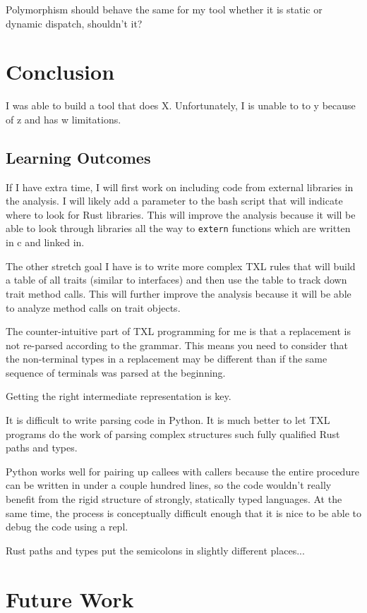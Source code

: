 \documentclass[11pt]{article}
\begin{document}
Polymorphism should behave the same for my tool whether it is static or dynamic dispatch, shouldn't it?

\section{Conclusion}
I was able to build a tool that does X.
Unfortunately, I is unable to to y because of z and has w limitations.

\subsection{Learning Outcomes}
If I have extra time, I will first work on including code from external libraries in the analysis.
I will likely add a parameter to the bash script that will indicate where to look for Rust libraries.
This will improve the analysis because it will be able to look through libraries all the way to \lstinline{extern} functions which are written in c and linked in.

The other stretch goal I have is to write more complex TXL rules that will build a table of all traits (similar to interfaces) and then use the table to track down trait method calls.
This will further improve the analysis because it will be able to analyze method calls on trait objects.

The counter-intuitive part of TXL programming for me is that a replacement is not re-parsed according to the grammar.
This means you need to consider that the non-terminal types in a replacement may be different than if the same sequence of terminals was parsed at the beginning.

Getting the right intermediate representation is key.

It is difficult to write parsing code in Python.
It is much better to let TXL programs do the work of parsing complex structures such fully qualified Rust paths and types.

Python works well for pairing up callees with callers because the entire procedure can be written in under a couple hundred lines, so the code wouldn't really benefit from the rigid structure of strongly, statically typed languages.
At the same time, the process is conceptually difficult enough that it is nice to be able to debug the code using a repl.

Rust paths and types put the semicolons in slightly different places...

\section{Future Work}
\end{document}
